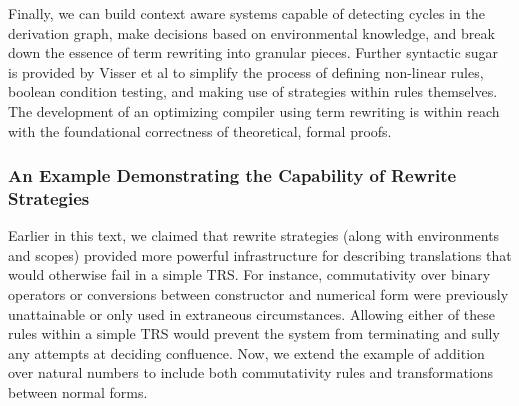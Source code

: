 \documentclass{article}
\begin{document}
Finally, we can build context aware systems capable of detecting cycles in the derivation graph, make decisions based on environmental knowledge,
and break down the essence of term rewriting into granular pieces. Further syntactic sugar is provided by Visser et al \cite{elco1998building}
to simplify the process of defining non-linear rules, boolean condition testing, and making use of strategies within rules themselves.
The development of an optimizing compiler using term rewriting is within reach with the foundational correctness of theoretical, formal proofs.

\subsubsection{An Example Demonstrating the Capability of Rewrite Strategies}
Earlier in this text, we claimed that rewrite strategies (along with environments and scopes) provided
more powerful infrastructure for describing translations that would otherwise fail in a simple TRS.
For instance, commutativity over binary operators or conversions between constructor and numerical form
were previously unattainable or only used in extraneous circumstances.
Allowing either of these rules within a simple TRS would prevent the system from terminating and sully any attempts at deciding confluence.
Now, we extend the example of addition over natural numbers to include both commutativity rules and transformations between normal forms.
\end{document}
